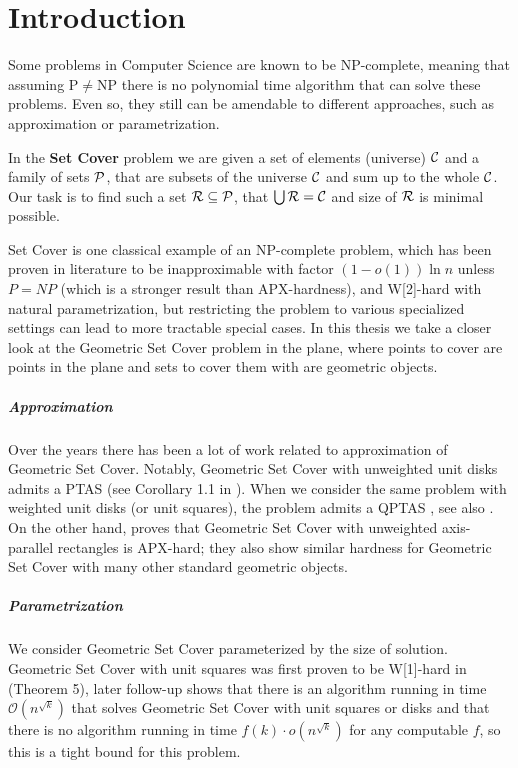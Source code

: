 \chapter{Introduction}

Some problems in Computer Science are known to be NP-complete,
meaning that assuming P$\neq$NP there is no polynomial time
algorithm that can solve these problems.
Even so, they still can be amendable to different approaches,
such as approximation or parametrization.

\begin{defi}
In the \textbf{Set Cover} problem we are given a set of elements (universe)
$\mathcal{C}$ and a family of sets $\mathcal{P}$, that are subsets of the universe $\mathcal{C}$
and sum up to the whole $\mathcal{C}$.
Our task is to find such a set $\mathcal{R} \subseteq \mathcal{P}$,
that $\bigcup \mathcal{R} = \mathcal{C}$ and size of $\mathcal{R}$ is minimal possible.
\end{defi}

Set Cover is one classical example of an NP-complete problem,
which has been proven
in literature to be
inapproximable with factor $(1-o(1))\ln n$ unless $P = NP$
(which is a stronger result than APX-hardness),
and W[2]-hard with natural parametrization,
but restricting the problem to various specialized settings
can lead to more tractable special cases.
In this thesis we take a closer look at the Geometric Set Cover problem
in the plane, where points to cover are points in the plane
and sets to cover them with are geometric objects.

\paragraph{Approximation}
Over the years there has been a lot of work related to approximation
of Geometric Set Cover. Notably,
Geometric Set Cover with unweighted unit disks admits a PTAS (see
Corollary 1.1 in \cite{unit_disks}). When we consider the same problem
with weighted unit disks (or unit squares), the problem admits a QPTAS
\cite{settling_apx_hardness}, see also \cite{voronoi_true}.
On the other hand, \cite{rectangles_apx_hard} 
proves that Geometric Set Cover with unweighted axis-parallel rectangles
is APX-hard; they also show similar hardness
for Geometric Set Cover with many other standard geometric objects.

\paragraph{Parametrization}
We consider Geometric Set Cover 
parameterized by the size of solution.
Geometric Set Cover with unit squares was first proven to be W[1]-hard 
in \cite{marx05} (Theorem 5), later follow-up \cite{voronoi}
shows that there is an algorithm running in time $\mathcal{O}(n^{\sqrt{k}})$
that solves Geometric Set Cover with unit squares or disks
and that there is no algorithm running in time $f(k) \cdot o(n^{\sqrt{k}})$
for any computable $f$, so this is a tight bound for this problem.


